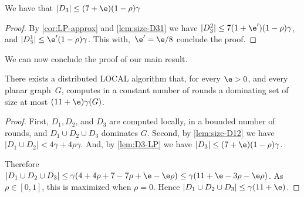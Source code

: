 \begin{lemma}\label{lem:D3-LP}
  We have that $|D_3| \le (7+\e)(1-\rho)\gamma$
\end{lemma}
\begin{proof}
  By \cref{cor:LP-approx} and \cref{lem:size-D31} we have
  $|D_3^2|\leq 7(1+\e')(1-\rho)\gamma$, and $|D_3^1|\le \e'(1-\rho)\gamma$.
  This with,~$\e'=\e/8$ conclude the proof.
\end{proof}

%
%

We can now conclude the proof of our main result.
\begin{theorem}\label{thm:planar}
  There exists a distributed LOCAL algorithm that, for every $\e>0$, and every
  planar graph~$G$, computes in a constant number of rounds a dominating set
  of size at most $(11+\e)\gamma(G)$.
\end{theorem}
\begin{proof}
  First, $D_1,D_2$, and $D_3$ are computed locally, in a bounded number of
  rounds, and $D_1 \cup D_2 \cup D_3$ dominates $G$.
%
  Second, by \cref{lem:size-D12} we have $|D_1\cup D_2|<4\gamma+4\rho\gamma$.
  And, by \cref{lem:D3-LP} we have $|D_3|\leq (7+\e)(1-\rho)\gamma$.

  Therefore $|D_1 \cup D_2 \cup D_3|\leq \gamma(4+4\rho +7 - 7\rho +\e - \e\rho)
  \leq \gamma(11+\e-3\rho -\e\rho)$.
  As $\rho\in[0,1]$, this is maximized when $\rho=0$. Hence
  $|D_1 \cup D_2 \cup D_3| \le \gamma(11+\e)$.

\end{proof}
